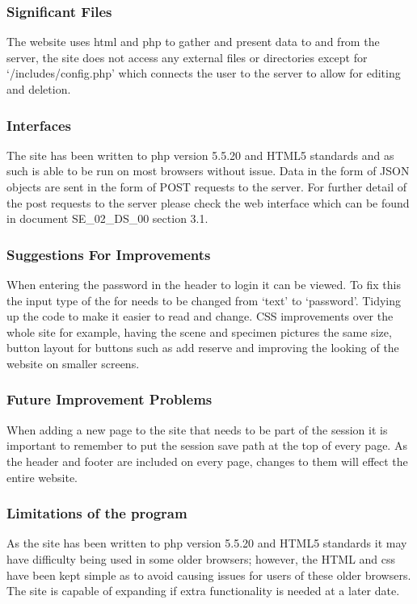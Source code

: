     \subsubsection{Significant Files}
        The website uses html and php to gather and present data to and from the server, the site does not access any external files or directories except for `/includes/config.php' which connects the user to the server to allow for editing and deletion.

    \subsubsection{Interfaces}
        The site has been written to php version 5.5.20 and HTML5 standards and as such is able to be run on most browsers without issue. Data in the form of JSON objects are sent in the form of POST requests to the server. For further detail of the post requests to the server please check the web interface which can be found in document SE\_02\_DS\_00 section 3.1.

    \subsubsection{Suggestions For Improvements}
        When entering the password in the header to login it can be viewed. To fix this the input type of the for needs to be changed from `text' to `password'. Tidying up the code to make it easier to read and change. CSS improvements over the whole site for example, having the scene and specimen pictures the same size, button layout for buttons such as add reserve and improving the looking of the website on smaller screens.
    
    \subsubsection{Future Improvement Problems}
        When adding a new page to the site that needs to be part of the session it is important to remember to put the session save path at the top of every page. As the header and footer are included on every page, changes to them will effect the entire website.

    \subsubsection{Limitations of the program}
        As the site has been written to php version 5.5.20 and HTML5 standards it may have difficulty being used in some older browsers; however, the HTML and css have been kept simple as to avoid causing issues for users of these older browsers. The site is capable of expanding if extra functionality is needed at a later date.

